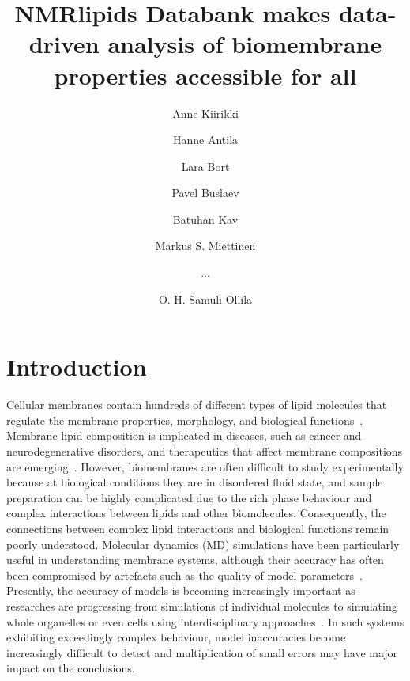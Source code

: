 \documentclass[fleqn,10pt]{wlscirep}
\title{NMRlipids Databank makes data-driven analysis of biomembrane properties accessible for all}
\author[1]{Anne Kiirikki}         %
\author[2]{Hanne Antila}          %
\author[2]{Lara Bort}             %
\author[2]{Pavel Buslaev}         %
\author[2]{Batuhan Kav}           %
\author[2]{Markus S. Miettinen}   %
\author[2]{...}                   %
\author[1,*]{O. H. Samuli Ollila} %
\affil[1]{University of Helsinki, Institute of Biotechnology, Helsinki, Finland}
\affil[2]{Affiliation, department, city, postcode, country}
\affil[*]{samuli.ollila@helsinki.fi}
\begin{document}
\flushbottom
\maketitle
%
%
\thispagestyle{empty}


\section{Introduction}


Cellular membranes contain hundreds of different types of lipid molecules that regulate the membrane properties, morphology, and biological functions~\cite{vanmeer08,Lorent:2020a,Slatter:2016a}. Membrane lipid composition is implicated in diseases, such as cancer and neurodegenerative disorders, and therapeutics that affect membrane compositions are emerging~\cite{torres21}. However, biomembranes are often difficult to study experimentally because at biological conditions they are in disordered fluid state, and sample preparation can be highly complicated due to the rich phase behaviour and complex interactions between lipids and other biomolecules. Consequently, the connections between complex lipid interactions and biological functions remain poorly understood.
Molecular dynamics (MD) simulations have been particularly useful in understanding membrane systems, although their accuracy has often been compromised by artefacts such as the quality of model parameters~\cite{antila22b,gupta22}. 
Presently, the accuracy of models is becoming increasingly important as researches are progressing from simulations of 
individual molecules to simulating whole organelles or even cells using interdisciplinary approaches~\cite{johnson15,thornburg22,gupta22}. In such systems exhibiting exceedingly complex behaviour,
model inaccuracies become increasingly difficult to detect and multiplication of small errors may have major impact on the conclusions.
\end{document}
